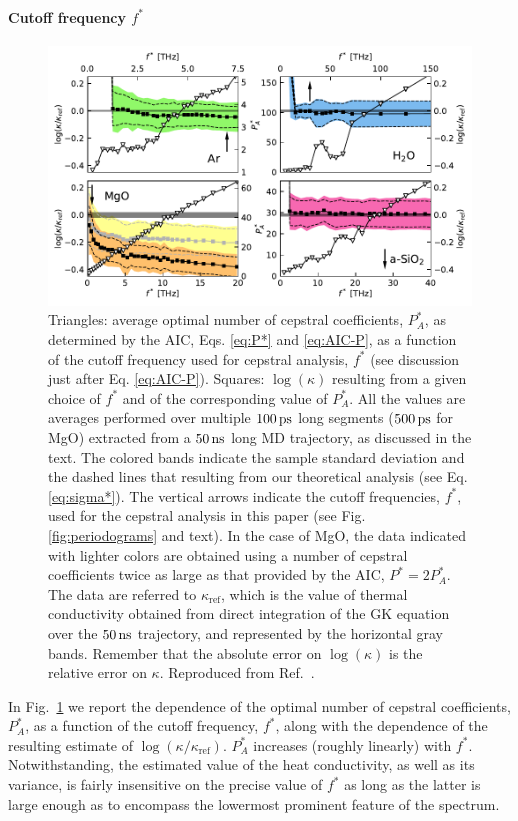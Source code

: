 \paragraph{Cutoff frequency $f^*$}
\begin{figure}[!tb]
    \centering
    \includegraphics[width=\textwidth]{chapters/chapter5/figures/kappa_vs_fstar.pdf}
    \caption{Triangles: average optimal number of cepstral coefficients, $P_A^*$, as determined by the AIC, Eqs. \eqref{eq:P*} and \eqref{eq:AIC-P}, as a function of the cutoff frequency used for cepstral analysis, $f^*$ (see discussion just after Eq. \eqref{eq:AIC-P}). Squares: $\log(\kappa)$ resulting from a given choice of $f^*$ and of the corresponding value of $P_A^*$. All the values are averages performed over multiple $100\,\mathrm{ps}$ long segments ($500\,\mathrm{ps}$ for MgO) extracted from a $50\,\mathrm{ns}$ long MD trajectory, as discussed in the text. The colored bands indicate the sample standard deviation and the dashed lines that resulting from our theoretical analysis (see Eq. \eqref{eq:sigma*}). The vertical arrows indicate the cutoff frequencies, $f^*$, used for the cepstral analysis in this paper (see Fig. \ref{fig:periodograms} and text). In the case of MgO, the data indicated with lighter colors are obtained using a number of cepstral coefficients twice as large as that provided by the AIC, $P^*=2P_A^*$. The data are referred to $\kappa_{\mathrm{ref}}$, which is the value of thermal conductivity obtained from direct integration of the GK equation over the $50\,\mathrm{ns}$ trajectory, and represented by the horizontal gray bands. Remember that the absolute error on $\log(\kappa)$ is the relative error on $\kappa$. Reproduced from Ref.~\cite{Ercole2017}.
    }
    \label{fig:kappa_vs_fstar}
\end{figure}
In Fig.~\ref{fig:kappa_vs_fstar} we report the dependence of the optimal number of cepstral coefficients, $P_A^*$, as a function of the cutoff frequency, $f^*$, along with the dependence of the resulting estimate of $\log(\kappa/\kappa_{\mathrm{ref}})$. $P_A^*$ increases (roughly linearly) with $f^*$. Notwithstanding, the estimated value of the heat conductivity, as well as its variance, is fairly insensitive on the precise value of $f^*$ as long as the latter is large enough as to encompass the lowermost prominent feature of the spectrum. 
